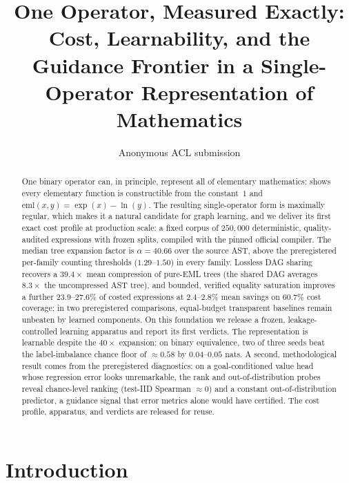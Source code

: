 \documentclass[11pt]{article}
\title{One Operator, Measured Exactly: Cost, Learnability, and the Guidance
Frontier in a Single-Operator Representation of Mathematics}
\author{Anonymous ACL submission}
\newcommand{\eml}{\ensuremath{\mathrm{eml}}}
\begin{document}
\maketitle

\begin{abstract}
One binary operator can, in principle, represent all of elementary mathematics:
\citet{odrzywolek2026} shows every elementary function is constructible from
the constant~$1$ and $\eml(x,y)=\exp(x)-\ln(y)$. The resulting single-operator
form is maximally regular, which makes it a natural candidate for graph
learning, and we deliver its first exact cost profile at production scale: a
fixed corpus of
$250{,}000$ deterministic, quality-audited expressions with frozen splits,
compiled with the pinned official compiler. The median tree expansion factor
is $\alpha=40.66$ over the source AST, above the preregistered per-family
counting thresholds ($1.29$--$1.50$) in every family. Lossless DAG sharing
recovers a $39.4\times$ mean compression of pure-EML trees (the shared DAG
averages $8.3\times$ the uncompressed AST tree), and bounded, verified
equality saturation improves a further $23.9$--$27.6\%$ of costed expressions
at $2.4$--$2.8\%$ mean savings on $60.7\%$ cost coverage; in two preregistered
comparisons, equal-budget transparent baselines remain unbeaten by learned
components. On this foundation we release a frozen, leakage-controlled
learning apparatus and report its first verdicts. The representation is
learnable despite the $40\times$ expansion: on binary equivalence, two of
three seeds beat the label-imbalance chance floor of ${\approx}0.58$ by
$0.04$--$0.05$ nats. A second, methodological result comes from the
preregistered diagnostics: on a goal-conditioned value head whose regression
error looks unremarkable, the rank and out-of-distribution probes reveal
chance-level ranking (test-IID Spearman ${\approx}0$) and a constant
out-of-distribution predictor, a guidance signal that error metrics alone
would have certified. The cost
profile, apparatus, and verdicts are released for reuse.
\end{abstract}

\section{Introduction}
\label{sec:intro}
\end{document}
